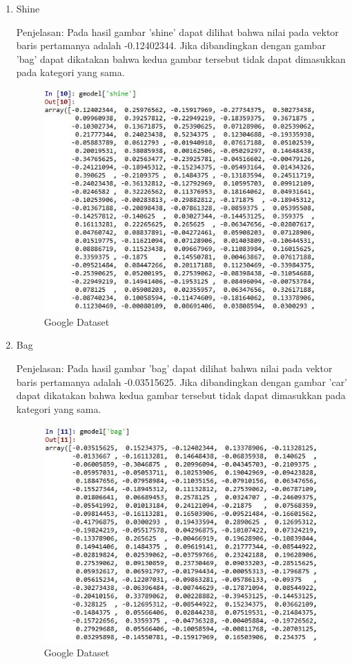 \begin{enumerate}
\begin{enumerate}
\item Shine

Penjelasan: Pada hasil gambar 'shine' dapat dilihat bahwa nilai pada vektor baris pertamanya adalah -0.12402344. Jika dibandingkan dengan gambar 'bag' dapat dikatakan bahwa kedua gambar tersebut tidak dapat dimasukkan pada kategori yang sama.

\begin{figure}[H]
\centering
\includegraphics[scale=0.7]{figures/1174051/5/17shine.jpg}
\caption{Google Dataset}
\label{Google Dataset}
\end{figure}

\item Bag

Penjelasan: Pada hasil gambar 'bag' dapat dilihat bahwa nilai pada vektor baris pertamanya adalah -0.03515625. Jika dibandingkan dengan gambar 'car' dapat dikatakan bahwa kedua gambar tersebut tidak dapat dimasukkan pada kategori yang sama.

\begin{figure}[H]
\centering
\includegraphics[scale=0.7]{figures/1174051/5/18bag.jpg}
\caption{Google Dataset}
\label{Google Dataset}
\end{figure}


\end{enumerate}
\end{enumerate}
